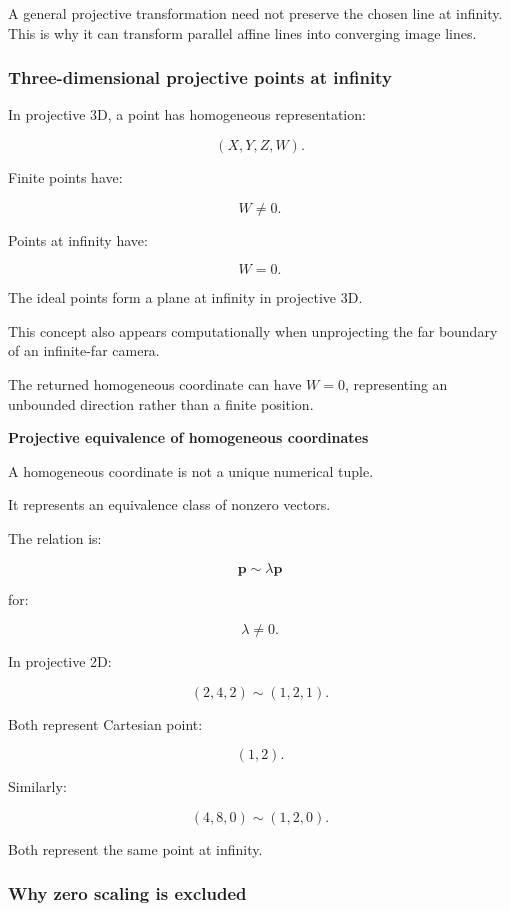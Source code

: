 A general projective transformation need not preserve the chosen line at infinity. This is why it can transform parallel affine lines into converging image lines.

\subsubsection{Three-dimensional projective points at infinity}\label{three-dimensional-projective-points-at-infinity}

In projective 3D, a point has homogeneous representation:

\[
 \boxed{ (X,Y,Z,W) }.
\]

Finite points have:

\[
 W\ne0.
\]

Points at infinity have:

\[
 \boxed{W=0}.
\]

The ideal points form a plane at infinity in projective 3D.

This concept also appears computationally when unprojecting the far boundary of an infinite-far camera.

The returned homogeneous coordinate can have \(W=0\), representing an unbounded direction rather than a finite position.

\textbf{Projective equivalence of homogeneous coordinates}

A homogeneous coordinate is not a unique numerical tuple.

It represents an equivalence class of nonzero vectors.

The relation is:

\[
 \boxed{ \mathbf p\sim\lambda\mathbf p }
\]

for:

\[
 \lambda\ne0.
\]

In projective 2D:

\[
 (2,4,2)\sim(1,2,1).
\]

Both represent Cartesian point:

\[
 (1,2).
\]

Similarly:

\[
 (4,8,0)\sim(1,2,0).
\]

Both represent the same point at infinity.

\subsubsection{Why zero scaling is excluded}\label{why-zero-scaling-is-excluded}

